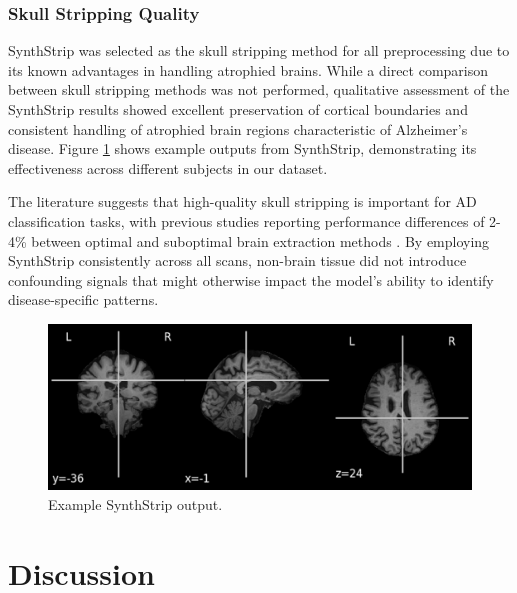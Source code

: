 \documentclass[12pt, a4paper]{article}
\begin{document}
\subsubsection{Skull Stripping Quality}

SynthStrip was selected as the skull stripping method for all preprocessing due to its known advantages in handling atrophied brains. While a direct comparison between skull stripping methods was not performed, qualitative assessment of the SynthStrip results showed excellent preservation of cortical boundaries and consistent handling of atrophied brain regions characteristic of Alzheimer's disease. Figure \ref{fig:skull_stripping_comparison} shows example outputs from SynthStrip, demonstrating its effectiveness across different subjects in our dataset.

The literature suggests that high-quality skull stripping is important for AD classification tasks, with previous studies reporting performance differences of 2-4\% between optimal and suboptimal brain extraction methods \cite{hoopes2022synthstrip}. By employing SynthStrip consistently across all scans, non-brain tissue did not introduce confounding signals that might otherwise impact the model's ability to identify disease-specific patterns.

\begin{figure}[htbp]
  \centering
  \includegraphics[width=\textwidth]{figures/ss.png}
  \caption{Example SynthStrip output.}
  \label{fig:skull_stripping_comparison}
\end{figure}

\section{Discussion}


\end{document}
